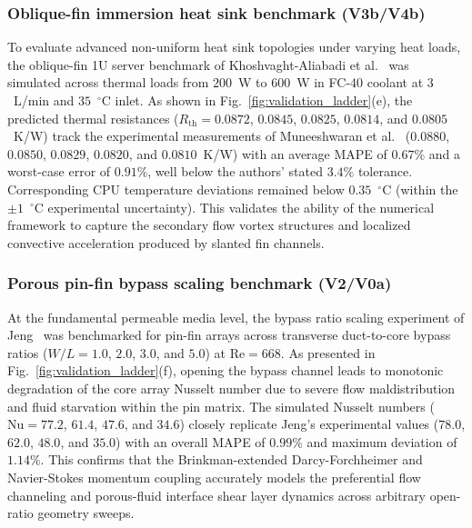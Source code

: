 \subsubsection{Oblique-fin immersion heat sink benchmark (V3b/V4b)}
\label{sec:vv-v3b-aliabadi-discussion}

To evaluate advanced non-uniform heat sink topologies under varying heat loads, the oblique-fin 1U server benchmark of Khoshvaght-Aliabadi et al.~\cite{khoshvaghtaliabadi2026oblique} was simulated across thermal loads from $200$~W to $600$~W in FC-40 coolant at $3$~L/min and $35$~$^{\circ}$C inlet. As shown in Fig.~\ref{fig:validation_ladder}(e), the predicted thermal resistances ($R_{\mathrm{th}} = 0.0872$, $0.0845$, $0.0825$, $0.0814$, and $0.0805$~K/W) track the experimental measurements of Muneeshwaran et al.~\cite{muneeshwaran2023} ($0.0880$, $0.0850$, $0.0829$, $0.0820$, and $0.0810$~K/W) with an average MAPE of $0.67\%$ and a worst-case error of $0.91\%$, well below the authors' stated $3.4\%$ tolerance. Corresponding CPU temperature deviations remained below $0.35$~$^{\circ}$C (within the $\pm 1$~$^{\circ}$C experimental uncertainty). This validates the ability of the numerical framework to capture the secondary flow vortex structures and localized convective acceleration produced by slanted fin channels.

\subsubsection{Porous pin-fin bypass scaling benchmark (V2/V0a)}
\label{sec:vv-v2-jeng-discussion}

At the fundamental permeable media level, the bypass ratio scaling experiment of Jeng~\cite{jeng2008} was benchmarked for pin-fin arrays across transverse duct-to-core bypass ratios ($W/L = 1.0$, $2.0$, $3.0$, and $5.0$) at $\mathrm{Re} = 668$. As presented in Fig.~\ref{fig:validation_ladder}(f), opening the bypass channel leads to monotonic degradation of the core array Nusselt number due to severe flow maldistribution and fluid starvation within the pin matrix. The simulated Nusselt numbers ($\mathrm{Nu} = 77.2$, $61.4$, $47.6$, and $34.6$) closely replicate Jeng's experimental values ($78.0$, $62.0$, $48.0$, and $35.0$) with an overall MAPE of $0.99\%$ and maximum deviation of $1.14\%$. This confirms that the Brinkman-extended Darcy-Forchheimer and Navier-Stokes momentum coupling accurately models the preferential flow channeling and porous-fluid interface shear layer dynamics across arbitrary open-ratio geometry sweeps.

